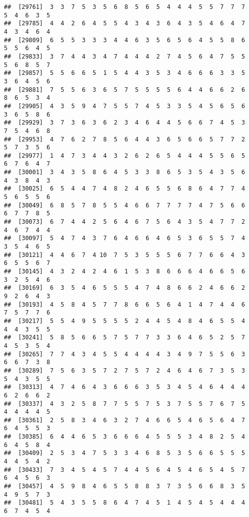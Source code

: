 \documentclass[
]{book}
\begin{document}
\begin{verbatim}
##  [29761]  3  3  7  5  3  5  6  8  5  6  5  4  4  4  5  5  7  7  7  5  4  6  3  5
##  [29785]  4  4  2  6  4  5  5  4  3  4  3  6  4  3  5  4  6  4  7  4  3  4  6  4
##  [29809]  6  5  5  3  3  3  4  4  6  3  5  6  5  6  4  5  5  8  6  5  5  6  4  5
##  [29833]  3  7  4  4  3  4  7  4  4  4  2  7  4  5  6  4  7  5  5  5  6  8  5  7
##  [29857]  5  5  6  6  5  1  5  4  4  3  5  3  4  6  6  6  3  3  5  3  6  4  5  6
##  [29881]  7  5  5  6  3  6  5  7  5  5  5  5  6  4  4  6  6  2  6  8  6  5  3  4
##  [29905]  4  3  5  9  4  7  5  5  7  4  5  3  3  5  4  5  6  5  6  3  6  5  8  6
##  [29929]  3  7  3  6  3  6  2  3  4  6  4  4  5  6  6  7  4  5  3  7  5  4  6  8
##  [29953]  4  7  6  2  7  8  5  6  4  4  3  6  5  6  6  5  7  7  2  5  7  3  5  6
##  [29977]  1  4  7  3  4  4  3  2  6  2  6  5  4  4  4  5  5  6  5  6  7  6  4  7
##  [30001]  3  4  3  5  8  6  4  5  3  3  8  6  5  3  5  4  3  5  6  4  3  8  4  3
##  [30025]  6  5  4  4  7  4  8  2  4  6  5  5  6  8  6  4  7  7  4  5  6  5  5  6
##  [30049]  6  8  5  7  8  5  5  4  6  6  7  7  7  7  4  7  5  6  6  6  7  7  8  5
##  [30073]  6  7  4  4  2  5  6  4  6  7  5  6  4  3  5  4  7  7  2  4  6  7  4  4
##  [30097]  5  4  7  4  3  7  6  4  6  6  4  6  5  3  6  5  5  7  4  3  5  4  6  5
##  [30121]  4  4  6  7  4 10  7  5  3  5  5  5  6  7  7  6  6  4  3  6  5  5  6  7
##  [30145]  4  3  2  4  2  4  6  1  5  3  8  6  6  6  4  6  6  5  6  3  2  5  4  6
##  [30169]  6  3  5  4  6  5  5  5  4  7  4  8  6  6  2  4  6  6  2  9  2  6  4  3
##  [30193]  4  5  8  4  5  7  7  8  6  6  5  6  4  1  4  7  4  4  6  7  5  7  7  6
##  [30217]  5  5  4  9  5  5  5  5  2  4  4  5  4  8  4  6  5  5  4  4  4  3  5  5
##  [30241]  5  8  5  6  6  5  7  5  7  7  3  3  6  4  6  5  2  5  7  4  5  3  5  4
##  [30265]  7  7  4  3  4  5  5  4  4  4  4  3  4  9  7  5  5  6  3  6  6  7  3  8
##  [30289]  7  5  6  3  5  7  2  7  5  7  2  4  6  4  6  7  3  5  3  5  4  3  5  5
##  [30313]  4  7  4  6  4  3  6  6  6  3  5  3  4  5  4  6  4  4  4  6  2  6  6  2
##  [30337]  4  3  2  5  8  7  7  5  5  7  5  3  7  5  5  7  6  7  5  4  4  4  4  5
##  [30361]  2  5  8  3  4  6  3  2  7  4  6  6  5  4  6  5  6  4  7  6  4  5  5  3
##  [30385]  6  4  4  6  5  3  6  6  6  4  5  5  5  3  4  8  2  5  4  6  4  5  8  4
##  [30409]  2  5  3  4  7  5  3  3  4  6  8  5  3  5  6  6  5  5  5  4  4  5  4  2
##  [30433]  7  3  4  5  4  5  7  4  4  5  6  4  5  4  6  5  4  5  7  6  4  5  6  3
##  [30457]  4  5  9  8  4  6  5  5  8  8  3  7  3  5  6  6  8  3  5  4  9  5  7  3
##  [30481]  5  4  3  5  5  8  6  4  7  4  5  1  4  5  4  5  4  4  4  6  7  4  5  4

\end{verbatim}
\end{document}
